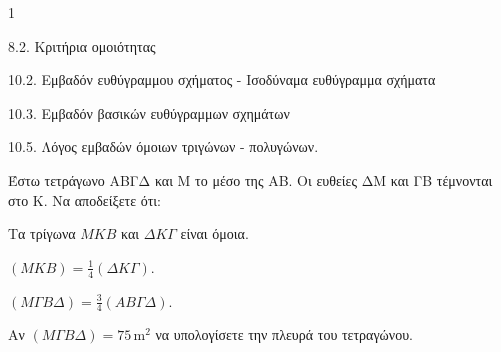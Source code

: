 \begin{ylh}{1}
    \item 8.2. Κριτήρια ομοιότητας
    \item 10.2. Εμβαδόν ευθύγραμμου σχήματος - Ισοδύναμα ευθύγραμμα σχήματα
    \item 10.3. Εμβαδόν βασικών ευθύγραμμων σχημάτων
    \item 10.5. Λόγος εμβαδών όμοιων τριγώνων - πολυγώνων.
\end{ylh}
\begin{figure} %
    \centering
\end{figure}
Έστω τετράγωνο ΑΒΓΔ και Μ το μέσο της ΑΒ. Οι ευθείες ΔΜ και ΓΒ τέμνονται στο Κ. Να αποδείξετε ότι:
\begin{alist}
\item Τα τρίγωνα $MKB$ και $\Delta K\Gamma$ είναι όμοια. 
\item $(MKB) = \frac{1}{4} (\Delta K\Gamma)$. 
\item $(M\Gamma B\Delta) = \frac{3}{4} (AB\Gamma\Delta)$. 
\item Αν $(M\Gamma B\Delta) = 75 \, \text{m}^2$ να υπολογίσετε την πλευρά του τετραγώνου. 
\end{alist}